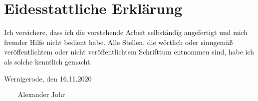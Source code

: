 \section*{Eidesstattliche Erklärung}


\vspace{10mm}

Ich versichere, dass ich die vorstehende Arbeit selbständig angefertigt und mich fremder 
Hilfe nicht bedient habe. Alle Stellen, die wörtlich oder sinngemäß veröffentlichtem oder 
nicht veröffentlichtem Schrifttum entnommen sind, habe ich als solche kenntlich gemacht.

\vspace{10mm}

Wernigerode, den 16.11.2020 

\begin{flushright}
    $\overline{~~~~~~~~~\mbox{Alexander Johr}~~~~~~~~~}$
\end{flushright}